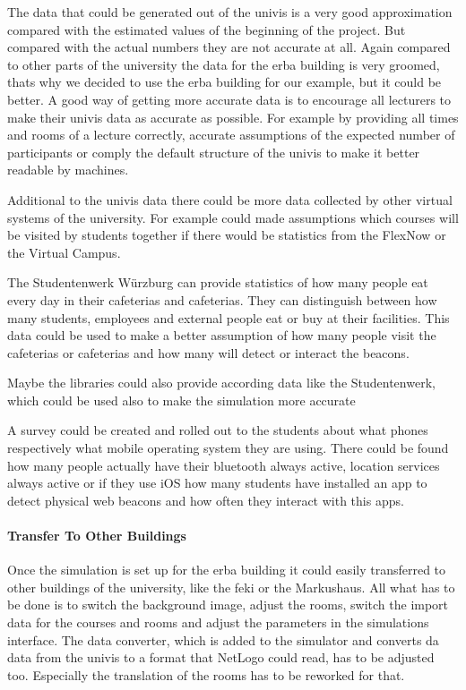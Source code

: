 \par The data that could be generated out of the univis is a very good approximation compared with the estimated values of the beginning of the project. But compared with the actual numbers they are not accurate at all. Again compared to other parts of the university the data for the erba building is very groomed, thats why we decided to use the erba building for our example, but it could be better. A good way of getting more accurate data is to encourage all lecturers to make their univis data as accurate as possible. For example by providing all times and rooms of a lecture correctly, accurate assumptions of the expected number of participants or comply the default structure of the univis to make it better readable by machines.

\par Additional to the univis data there could be more data collected by other virtual systems of the university. For example could made assumptions which courses will be visited by students together if there would be statistics from the FlexNow or the Virtual Campus.

\par The Studentenwerk W{\"u}rzburg can provide statistics of how many people eat every day in their cafeterias and cafeterias. They can distinguish between how many students, employees and external people eat or buy at their facilities. This data could be used to make a better assumption of how many people visit the cafeterias or cafeterias and how many will detect or interact the beacons.

\par Maybe the libraries could also provide according data like the Studentenwerk, which could be used also to make the simulation more accurate

\par A survey could be created and rolled out to the students about what phones respectively what mobile operating system they are using. There could be found how many people actually have their bluetooth always active, location services always active or if they use iOS how many students have installed an app to detect physical web beacons and how often they interact with this apps.

\paragraph{Transfer To Other Buildings}

Once the simulation is set up for the erba building it could easily transferred to other buildings of the university, like the feki or the Markushaus. All what has to be done is to switch the background image, adjust the rooms, switch the import data for the courses and rooms and adjust the parameters in the simulations interface.
The data converter, which is added to the simulator and converts da data from the univis to a format that NetLogo could read, has to be adjusted too. Especially the translation of the rooms has to be reworked for that.

